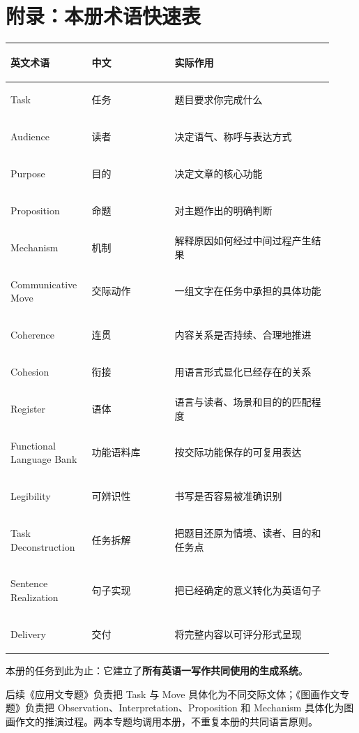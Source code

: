 \documentclass[11pt,a4paper]{ctexart}
\newcommand{\kw}[1]{\textbf{#1}}
\begin{document}
\section{附录：本册术语快速表}
\small
\begin{longtable}{>{\bfseries\raggedright\arraybackslash}p{0.22\linewidth} >{\raggedright\arraybackslash}p{0.24\linewidth} >{\raggedright\arraybackslash}p{0.46\linewidth}}
\toprule
英文术语 & 中文 & 实际作用 \\
\midrule
Task & 任务 & 题目要求你完成什么 \\
Audience & 读者 & 决定语气、称呼与表达方式 \\
Purpose & 目的 & 决定文章的核心功能 \\
Proposition & 命题 & 对主题作出的明确判断 \\
Mechanism & 机制 & 解释原因如何经过中间过程产生结果 \\
Communicative Move & 交际动作 & 一组文字在任务中承担的具体功能 \\
Coherence & 连贯 & 内容关系是否持续、合理地推进 \\
Cohesion & 衔接 & 用语言形式显化已经存在的关系 \\
Register & 语体 & 语言与读者、场景和目的的匹配程度 \\
Functional Language Bank & 功能语料库 & 按交际功能保存的可复用表达 \\
Legibility & 可辨识性 & 书写是否容易被准确识别 \\
Task Deconstruction & 任务拆解 & 把题目还原为情境、读者、目的和任务点 \\
Sentence Realization & 句子实现 & 把已经确定的意义转化为英语句子 \\
Delivery & 交付 & 将完整内容以可评分形式呈现 \\
\bottomrule
\end{longtable}
\normalsize

\begin{corebox}[本册最终边界]
本册的任务到此为止：它建立了\kw{所有英语一写作共同使用的生成系统}。

后续《应用文专题》负责把 Task 与 Move 具体化为不同交际文体；《图画作文专题》负责把 Observation、Interpretation、Proposition 和 Mechanism 具体化为图画作文的推演过程。两本专题均调用本册，不重复本册的共同语言原则。
\end{corebox}
\end{document}

